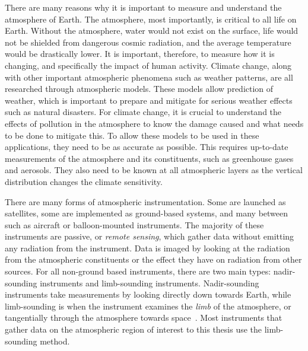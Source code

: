 There are many reasons why it is important to measure and understand the atmosphere of Earth. The atmosphere, most importantly, is critical to all life on Earth. Without the atmosphere, water would not exist on the surface, life would not be shielded from dangerous cosmic radiation, and the average temperature would be drastically lower. It is important, therefore, to measure how it is changing, and specifically the impact of human activity. Climate change, along with other important atmospheric phenomena such as weather patterns, are all researched through atmospheric models. These models allow prediction of weather, which is important to prepare and mitigate for serious weather effects such as natural disasters. For climate change, it is crucial to understand the effects of pollution in the atmosphere to know the damage caused and what needs to be done to mitigate this. To allow these models to be used in these applications, they need to be as accurate as possible. This requires up-to-date measurements of the atmosphere and its constituents, such as greenhouse gases and aerosols. They also need to be known at all atmospheric layers as the vertical distribution changes the climate sensitivity.

There are many forms of atmospheric instrumentation. Some are launched as satellites, some are implemented as ground-based systems, and many between such as aircraft or balloon-mounted instruments. The majority of these instruments are passive, or \textit{remote sensing}, which gather data without emitting any radiation from the instrument. Data is imaged by looking at the radiation from the atmospheric constituents or the effect they have on radiation from other sources. For all non-ground based instruments, there are two main types: nadir-sounding instruments and limb-sounding instruments. Nadir-sounding instruments take measurements by looking directly down towards Earth, while limb-sounding is when the instrument examines the \textit{limb} of the atmosphere, or tangentially through the atmosphere towards space~\citep{SPARC}. Most instruments that gather data on the atmospheric region of interest to this thesis use the limb-sounding method.

